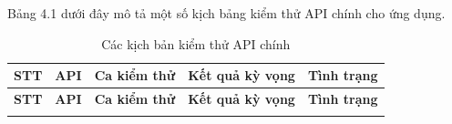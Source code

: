 Bảng 4.1 dưới đây mô tả một số kịch bảng kiểm thử API chính cho ứng dụng. 

\small
\begin{xltabular}{\textwidth}{|c|p{2cm}|X|X|c|}
    \caption{Các kịch bản kiểm thử API chính} \label{tab:api-test-cases} \\
    \hline
    \textbf{STT} & \textbf{API} & \textbf{Ca kiểm thử} & \textbf{Kết quả kỳ vọng} & \textbf{Tình trạng} \\
    \hline
    \endfirsthead
    
    \hline
    \textbf{STT} & \textbf{API} & \textbf{Ca kiểm thử} & \textbf{Kết quả kỳ vọng} & \textbf{Tình trạng} \\
    \hline
    \endhead
    
    \hline 
    \endfoot
    
    \hline
    \endlastfoot
    

\end{xltabular}
